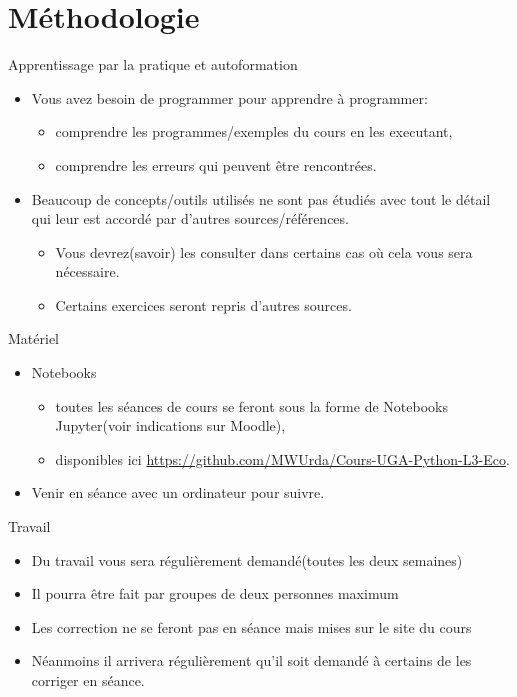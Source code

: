 \section{Méthodologie}
\frame{\sectionpage}

\begin{frame}[allowframebreaks]{Apprentissage par la pratique et autoformation}
    \begin{itemize}
        \item Vous avez besoin de programmer pour apprendre à programmer:
        \begin{itemize}
            \item comprendre les programmes/exemples du cours en les executant,
            \item comprendre les erreurs qui peuvent être rencontrées.
        \end{itemize}
        \item Beaucoup de concepts/outils utilisés ne sont pas étudiés avec tout le détail qui leur est accordé 
        par d'autres sources/références.
        \begin{itemize}
            \item Vous devrez(savoir) les consulter dans certains cas où cela vous sera nécessaire.
            \item Certains exercices seront repris d'autres sources.
        \end{itemize}
    \end{itemize}
\end{frame}

\begin{frame}[allowframebreaks]{Matériel}
    \begin{itemize}
        \item Notebooks
        \begin{itemize}
            \item toutes les séances de cours se feront sous la forme de Notebooks Jupyter(voir indications sur Moodle),
            \item disponibles ici \url{https://github.com/MWUrda/Cours-UGA-Python-L3-Eco}.
        \end{itemize} 
        \item  Venir en séance avec un ordinateur pour suivre.
    \end{itemize}
\end{frame}

\begin{frame}[allowframebreaks]{Travail}
\begin{itemize}
    \item Du travail vous sera régulièrement demandé(toutes les deux semaines)
    \item Il pourra être fait par groupes de deux personnes maximum
    \item Les correction ne se feront pas en séance mais mises sur le site du cours
    \item Néanmoins il arrivera régulièrement qu'il soit demandé à certains de les corriger en séance.
\end{itemize}
\end{frame}

